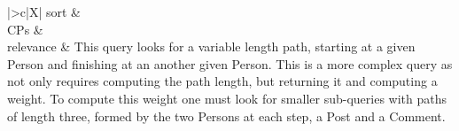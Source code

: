 \begin{tabularx}{\queryCardWidth}{|>{\queryPropertyCell}c|X|}
%
	sort        &
        \innerCardVSpace \\ \hline
	CPs &
	 \\ \hline
    relevance &
        \small This query looks for a variable length path, starting at a given Person and finishing at an another given Person. This
is a more complex query as not only requires computing the path length, but returning it and computing a weight.
To compute this weight one must look for smaller sub-queries with paths of length three, formed by the two Persons
at each step, a Post and a Comment.
 \\ \hline%
\end{tabularx}
\queryCardVSpace